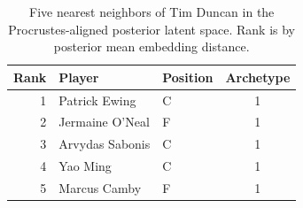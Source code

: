 \begin{table}[htbp]
  \centering\small
  \begin{tabular}{rllc}
    \toprule
    Rank & Player & Position & Archetype \\
    \midrule
    1 & Patrick Ewing & C & 1 \\
    2 & Jermaine O'Neal & F & 1 \\
    3 & Arvydas Sabonis & C & 1 \\
    4 & Yao Ming & C & 1 \\
    5 & Marcus Camby & F & 1 \\
    \bottomrule
  \end{tabular}
  \caption{Five nearest neighbors of Tim Duncan in the Procrustes-aligned posterior latent space. Rank is by posterior mean embedding distance.}
  \label{tab:Tim_Duncan_neighbors}
\end{table}

